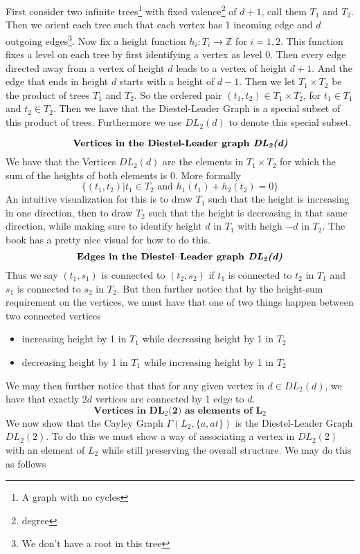 \begin{definition}
    First consider two infinite trees\footnote{A graph with no cycles} with fixed valence\footnote{degree} of $d+1$, call them $T_1$ and $T_2$. Then we orient each tree such that each vertex has 1 incoming edge and $d$ outgoing edges\footnote{We don't have a root in this tree}. Now fix a height function $h_i : T_i\to\mathbb{Z}$ for $i=1,2$. This function fixes a level on each tree by first identifying a vertex as level 0. Then every edge directed away from a vertex of height $d$ leads to a vertex of height $d+1$. And the edge that ends in height $d$ starts with a height of $d-1$. Then we let $T_1\times T_2$ be the product of trees $T_1$ and $T_2$. So the ordered pair $(t_1,t_2)\in T_1\times T_2$, for $t_1\in T_1$ and $t_2\in T_2$. Then we have that the Diestel-Leader Graph is a special subset of this product of trees. Furthermore we use $DL_2(d)$ to denote this special subset.
\end{definition}
\newpage
\[\textbf{Vertices in the Diestel-Leader graph \textit{DL$_\textit{2}$(d)}}\]
We have that the Vertices $DL_2(d)$ are the elements in $T_1\times T_2$ for which the sum of the heights of both elements is 0. More formally
\[\{(t_1,t_2)\vert t_1\in T_2\text{ and } h_1(t_1)+h_2(t_2)=0\}\]
An intuitive visualization for this is to draw $T_1$ such that the height is increasing in one direction, then to draw $T_2$ such that the height is decreasing in that same direction, while making sure to identify height $d$ in $T_1$ with heigh $-d$ in $T_2$. The book has a pretty nice visual for how to do this.
\[\textbf{Edges in the Diestel–Leader graph \textit{DL$_\textit{2}$(d)}}\]
Thus we say $(t_1,s_1)$ is connected to $(t_2,s_2)$ if $t_1$ is connected to $t_2$ in $T_1$ and $s_1$ is connected to $s_2$ in $T_2$. But then further notice that by the height-sum requirement on the vertices, we must have that one of two things happen between two connected vertices
\begin{itemize}
    \item increasing height by 1 in $T_1$ while decreasing height by 1 in $T_2$
    \item decreasing height by 1 in $T_1$ while increasing height by 1 in $T_2$
\end{itemize}
We may then further notice that that for any given vertex in $d\in DL_2(d)$, we have that exactly $2d$ vertices are connected by 1 edge to $d$.
\[\textbf{Vertices in DL$_\textit{2}$(2) as elements of L$_\textit{2}$}\]
We now show that the Cayley Graph $\Gamma(L_2,\{a,at\})$ is the Diestel-Leader Graph $DL_2(2)$. To do this we must show a way of associating a vertex in $DL_2(2)$ with an element of $L_2$ while still preserving the overall structure. We may do this as follows
